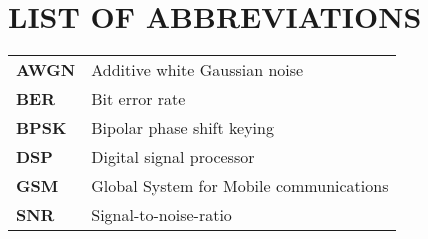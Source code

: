 
\section*{LIST OF ABBREVIATIONS}

\begin{tabular}{p{3cm}l}
  \textbf{AWGN}         &  Additive white Gaussian noise \\
  \textbf{BER}          &  Bit error rate \\
  \textbf{BPSK}         &  Bipolar phase shift keying \\
  \textbf{DSP}          &  Digital signal processor \\
  \textbf{GSM}          &  Global System for Mobile communications \\
  \textbf{SNR}          &  Signal-to-noise-ratio  \\
\end{tabular}

